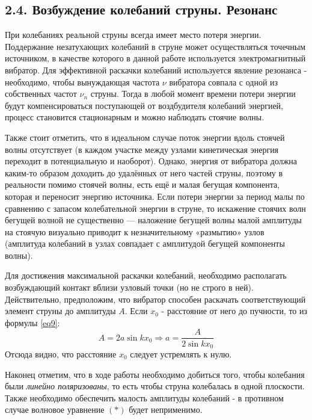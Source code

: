 \documentclass[a4paper]{article}
\begin{document}
\subsection*{2.4. Возбуждение колебаний струны. Резонанс} При колебаниях реальной струны всегда имеет место потеря энергии. Поддержание незатухающих
колебаний в струне может осуществляться точечным источником, в качестве которого в данной работе используется электромагнитный вибратор. 
Для эффективной раскачки колебаний используется явление резонанса - необходимо, чтобы вынуждающая частота $\nu$ вибратора совпала с одной из собственных частот $\nu_n$ струны. Тогда в любой момент времени потери энергии будут компенсироваться поступающей от воздбудителя колебаний энергией, процесс становится стационарным и можно наблюдать стоячие волны.

\noindent
Также стоит отметить, что в идеальном случае поток энергии вдоль стоячей волны отсутствует (в каждом участке между узлами кинетическая энергия переходит в потенциальную и наоборот). Однако, энергия от вибратора должна каким-то образом доходить до удалённых от него частей струны, поэтому в реальности помимо стоячей волны, есть ещё и малая бегущая компонента, которая и переносит энергию источника. Если потери энергии за период малы по сравнению с запасом колебательной энергии в струне, то искажение стоячих волн бегущей волной не существенно — наложение бегущей волны малой амплитуды на стоячую визуально приводит к незначительному «размытию» узлов (амплитуда колебаний в узлах совпадает с амплитудой бегущей компоненты волны).

\noindent
Для достижения максимальной раскачки колебаний, необходимо располагать возбуждающий контакт вблизи узловый точки (но не строго в ней). Действительно, предположим, что вибратор способен раскачать соответствующий элемент струны до амплитуды $A$. Если $x_0$ - расстояние от него до пучности, то из формулы \eqref{eq9}:
\[A = 2a \sin{kx_0} \Rightarrow a = \frac{A}{2\sin{kx_0}} \]
Отсюда видно, что расстояние $x_0$ следует устремлять к нулю.

\noindent
Наконец отметим, что в ходе работы необходимо добиться того, чтобы колебания были \textit{линейно поляризованы}, то есть чтобы струна колебалась в одной плоскости. Также необходимо обеспечить малость амплитуды колебаний - в противном случае волновое уравнение $(*)$ будет неприменимо.
\end{document}
